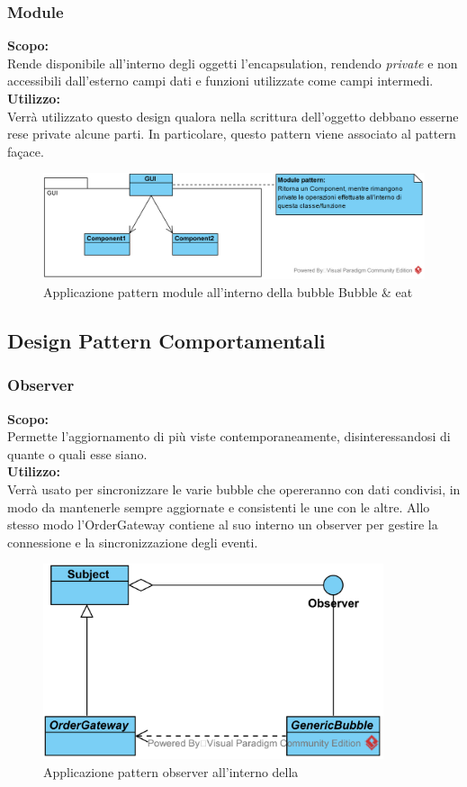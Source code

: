 \subsubsection{Module}
\textbf{Scopo:} \\
Rende disponibile all'interno degli oggetti l'encapsulation, rendendo \textit{private} e non accessibili dall'esterno campi dati e funzioni utilizzate come campi intermedi.\\
\textbf{Utilizzo:} \\
Verrà utilizzato questo design qualora nella scrittura dell'oggetto debbano esserne rese private alcune parti. In particolare, questo pattern viene associato al pattern fa\c{c}ace.
\begin{figure}[H]
	\centering
	\includegraphics[width=15cm]{./diagrammi_img/applicazione_pattern/module_framework.png}
	\caption{Applicazione pattern module all'interno della bubble Bubble \& eat}
\end{figure}

\subsection{Design Pattern Comportamentali}\label{DesignPatterComportamentali}

\subsubsection{Observer}
\textbf{Scopo:} \\
Permette l'aggiornamento di più viste contemporaneamente, disinteressandosi di quante o quali esse siano.\\
\textbf{Utilizzo:} \\
Verrà usato per sincronizzare le varie bubble che opereranno con dati condivisi, in modo da mantenerle sempre aggiornate e consistenti le une con le altre. Allo stesso modo l'OrderGateway contiene al suo interno un observer per gestire la connessione e la sincronizzazione degli eventi.
\begin{figure}[H]
	\centering
	\includegraphics[width=10cm]{./diagrammi_img/applicazione_pattern/observer_demo.png}
	\caption{Applicazione pattern observer all'interno della \DemoName}
\end{figure}

